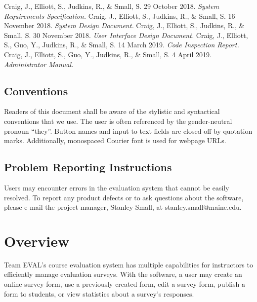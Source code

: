 \documentclass{article}
\begin{document}
Craig, J., Elliott, S., Judkins, R., \& Small, S. 29 October 2018. \textit{System Requirements Specification.}
\vspace{3mm}\newline
Craig, J., Elliott, S., Judkins, R., \& Small, S. 16 November 2018. \textit{System Design Document.}
\vspace{3mm}\newline
Craig, J., Elliott, S., Judkins, R., \& Small, S. 30 November 2018. \textit{User Interface Design Document.}
\vspace{3mm}\newline
Craig, J., Elliott, S., Guo, Y., Judkins, R., \& Small, S. 14 March 2019. \textit{Code Inspection Report.}
\vspace{3mm}\newline
Craig, J., Elliott, S., Guo, Y., Judkins, R., \& Small, S. 4 April 2019. \textit{Administrator Manual.}

\subsection{Conventions}

Readers of this document shall be aware of the stylistic and syntactical conventions that we use. The user is often referenced by the gender-neutral pronoun ``they''. Button names and input to text fields are closed off by quotation marks. Additionally, monospaced Courier font is used for webpage URLs.

\subsection{Problem Reporting Instructions}

Users may encounter errors in the evaluation system that cannot be easily resolved. To report any product defects or to ask questions about the software, please e-mail the project manager, Stanley Small, at stanley.small@maine.edu.

\section{Overview}

Team EVAL's course evaluation system has multiple capabilities for instructors to efficiently manage evaluation surveys. With the software, a user may create an online survey form, use a previously created form, edit a survey form, publish a form to students, or view statistics about a survey's responses.
\end{document}
